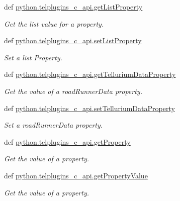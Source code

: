 \begin{DoxyCompactItemize}
def \hyperlink{group__plugin__properties_ga355878aacc1a635b4d4297790e4809c5}{python.\-telplugins\-\_\-c\-\_\-api.\-get\-List\-Property}
\begin{DoxyCompactList}\small\item\em Get the list value for a property. \end{DoxyCompactList}\item 
def \hyperlink{group__plugin__properties_gadb9c4c6a80a76b4f30970c9475bfaad0}{python.\-telplugins\-\_\-c\-\_\-api.\-set\-List\-Property}
\begin{DoxyCompactList}\small\item\em Set a list Property. \end{DoxyCompactList}\item 
def \hyperlink{group__plugin__properties_gad71e467254118c8688b43729efa77899}{python.\-telplugins\-\_\-c\-\_\-api.\-get\-Tellurium\-Data\-Property}
\begin{DoxyCompactList}\small\item\em Get the value of a road\-Runner\-Data property. \end{DoxyCompactList}\item 
def \hyperlink{group__plugin__properties_ga5a5905f864cb1853ecb1226c2a417876}{python.\-telplugins\-\_\-c\-\_\-api.\-set\-Tellurium\-Data\-Property}
\begin{DoxyCompactList}\small\item\em Set a road\-Runner\-Data property. \end{DoxyCompactList}\item 
def \hyperlink{group__plugin__properties_gaee7df409d1aed3649ea362473b4059b8}{python.\-telplugins\-\_\-c\-\_\-api.\-get\-Property}
\begin{DoxyCompactList}\small\item\em Get the value of a property. \end{DoxyCompactList}\item 
def \hyperlink{group__plugin__properties_ga6bdc6a474610576a4dc7384c8101ea06}{python.\-telplugins\-\_\-c\-\_\-api.\-get\-Property\-Value}
\begin{DoxyCompactList}\small\item\em Get the value of a property. \end{DoxyCompactList}\end{DoxyCompactItemize}


